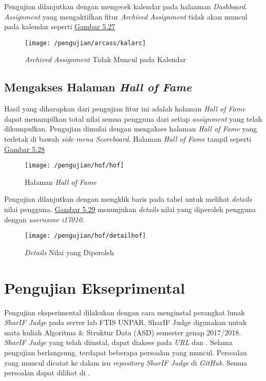	Pengujian dilanjutkan dengan mengecek kalendar pada halaaman \textit{Dashboard}. \textit{Assignment} yang mengaktifkan fitur \textit{Archived Assignment} tidak akan muncul pada kalendar seperti \hyperref[fig:kalarc]{Gambar 5.27}
	\begin{figure}[H]
		\centering  
		\texttt{[image: /pengujian/arcass/kalarc]}  
		\caption[\textit{Archived Assignment} Tidak Muncul pada Kalendar]{\textit{Archived Assignment} Tidak Muncul pada Kalendar} 
		\label{fig:kalarc} 
	\end{figure}

	\subsection{Mengakses Halaman \textit{Hall of Fame}}
	Hasil yang diharapkan dari pengujian fitur ini adalah halaman \textit{Hall of Fame} dapat menampilkan total nilai semua pengguna dari setiap \textit{assignment} yang telah dikumpulkan. Pengujian dimulai dengan mengakses halaman \textit{Hall of Fame} yang terletak di bawah \textit{side menu Scoreboard}. Halaman \textit{Hall of Fame} tampil seperti \hyperref[fig:halhof]{Gambar 5.28}
	\begin{figure}[H]
		\centering  
		\texttt{[image: /pengujian/hof/hof]}  
		\caption[Halaman \textit{Hall of Fame}]{Halaman \textit{Hall of Fame}} 
		\label{fig:halhof} 
	\end{figure}

	Pengujian dilanjutkan dengan mengklik baris pada tabel untuk melihat \textit{details} nilai pengguna. \hyperref[fig:dethof]{Gambar 5.29} menunjukan \textit{details} nilai yang diperoleh pengguna dengan \textit{username i17010}.
	\begin{figure}[H]
		\centering  
		\texttt{[image: /pengujian/hof/detailhof]}  
		\caption[\textit{Details} Nilai yang Diperoleh]{\textit{Details} Nilai yang Diperoleh} 
		\label{fig:dethof} 
	\end{figure}
	
\section{Pengujian Ekseprimental}
Pengujian eksperimental dilakukan dengan cara menginstal perangkat lunak \textit{SharIF Judge} pada server lab FTIS UNPAR. SharIF Judge digunakan untuk mata kuliah Algoritma \& Struktur Data (ASD) semester genap 2017/2018. \textit{SharIF Judge} yang telah diinstal, dapat diakses pada \textit{URL}  dan . Selama pengujian berlangsung, terdapat beberapa persoalan yang muncul. Persoalan yang muncul dicatat ke dalam isu \textit{repository SharIF Judge} di \textit{GitHub}. Semua persoalan dapat dilihat di .

